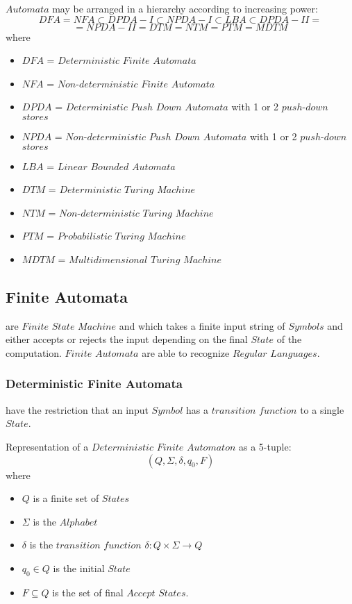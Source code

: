 \documentclass{article}
\begin{document}
$Automata$ may be arranged in a hierarchy according to increasing
power:
\[
    DFA = NFA \subset DPDA-I \subset NPDA-I \subset LBA \subset DPDA-II =
\]\[
    = NPDA-II = DTM = NTM = PTM = MDTM
\]
where
\begin{itemize}
\item $DFA$ = $Deterministic$ $Finite$ $Automata$
\item $NFA$ = $Non$-$deterministic$ $Finite$ $Automata$
\item $DPDA$ = $Deterministic$ $Push$ $Down$ $Automata$ with 1
  or 2 $push$-$down$ $stores$
\item $NPDA$ = $Non$-$deterministic$ $Push$ $Down$ $Automata$
  with 1 or 2 $push$-$down$ $stores$
\item $LBA$ = $Linear$ $Bounded$ $Automata$
\item $DTM$ = $Deterministic$ $Turing$ $Machine$
\item $NTM$ = $Non$-$deterministic$ $Turing$ $Machine$
\item $PTM$ = $Probabilistic$ $Turing$ $Machine$
\item $MDTM$ = $Multidimensional$ $Turing$ $Machine$
\end{itemize}

\subsection{Finite Automata} are $Finite$ $State$
$Machine$ and which takes a finite input string of $Symbols$ and
either accepts or rejects the input depending on the final $State$ of
the computation. $Finite$ $Automata$ are able to recognize $Regular$
$Languages$.

\subsubsection{Deterministic Finite Automata} have the restriction
that an input $Symbol$ has a $transition$ $function$ to a single
$State$.

Representation of a $Deterministic$ $Finite$ $Automaton$ as a 5-tuple:
\[
    (Q,\Sigma,\delta,q_0,F)
\]
where
\begin{itemize}
\item $Q$ is a finite set of $States$
\item $\Sigma$ is the $Alphabet$
\item $\delta$ is the $transition$ $function$ $\delta: Q \times
  \Sigma \rightarrow Q$
\item $q_0 \in Q$ is the initial $State$
\item $F \subseteq Q$ is the set of final $Accept$ $States$.
\end{itemize}
\end{document}
